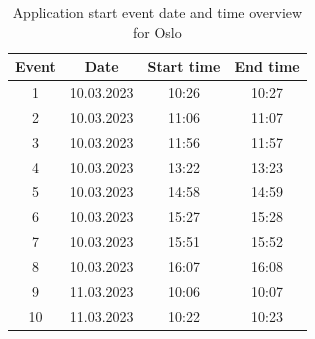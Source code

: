 \begin{table}[H]
\centering
\caption{Application start event date and time overview for Oslo}
\label{tab:AS_dateandtimeOslo}
\begin{tabular}{|c|c|c|c|}
\hline
\textbf{Event} & \textbf{Date} & \textbf{Start time} & \textbf{End time} \\ \hline
1              & 10.03.2023         & 10:26               & 10:27             \\ \hline
2              & 10.03.2023         & 11:06               & 11:07             \\ \hline
3              & 10.03.2023         & 11:56               & 11:57             \\ \hline
4              & 10.03.2023         & 13:22               & 13:23             \\ \hline
5              & 10.03.2023         & 14:58               & 14:59             \\ \hline
6              & 10.03.2023         & 15:27               & 15:28             \\ \hline
7              & 10.03.2023         & 15:51               & 15:52             \\ \hline
8              & 10.03.2023         & 16:07               & 16:08             \\ \hline
9              & 11.03.2023         & 10:06               & 10:07             \\ \hline
10             & 11.03.2023         & 10:22               & 10:23             \\ \hline
\end{tabular}
\end{table}

